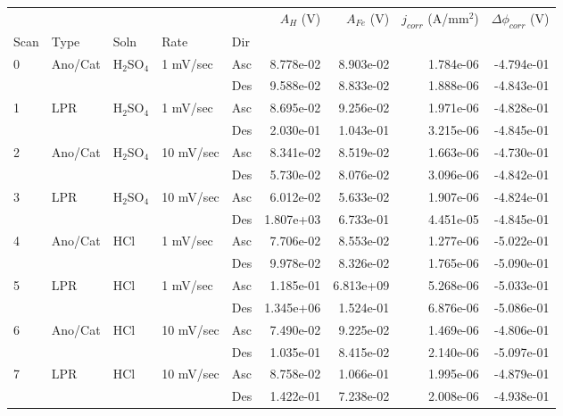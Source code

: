 \begin{tabular}{lllllrrrr}
\toprule
  &     &     &           &     &  $A_H$ (V) &  $A_{Fe}$ (V) &  $j_{corr}$ (A/mm$^2$) &  $\Delta \phi_{corr}$ (V) \\
Scan & Type & Soln & Rate & Dir &            &               &                        &                           \\
\midrule
0 & Ano/Cat & H$_2$SO$_4$ & 1 mV/sec & Asc &  8.778e-02 &     8.903e-02 &              1.784e-06 &                -4.794e-01 \\
  &     &     &           & Des &  9.588e-02 &     8.833e-02 &              1.888e-06 &                -4.843e-01 \\
1 & LPR & H$_2$SO$_4$ & 1 mV/sec & Asc &  8.695e-02 &     9.256e-02 &              1.971e-06 &                -4.828e-01 \\
  &     &     &           & Des &  2.030e-01 &     1.043e-01 &              3.215e-06 &                -4.845e-01 \\
2 & Ano/Cat & H$_2$SO$_4$ & 10 mV/sec & Asc &  8.341e-02 &     8.519e-02 &              1.663e-06 &                -4.730e-01 \\
  &     &     &           & Des &  5.730e-02 &     8.076e-02 &              3.096e-06 &                -4.842e-01 \\
3 & LPR & H$_2$SO$_4$ & 10 mV/sec & Asc &  6.012e-02 &     5.633e-02 &              1.907e-06 &                -4.824e-01 \\
  &     &     &           & Des &  1.807e+03 &     6.733e-01 &              4.451e-05 &                -4.845e-01 \\
4 & Ano/Cat & HCl & 1 mV/sec & Asc &  7.706e-02 &     8.553e-02 &              1.277e-06 &                -5.022e-01 \\
  &     &     &           & Des &  9.978e-02 &     8.326e-02 &              1.765e-06 &                -5.090e-01 \\
5 & LPR & HCl & 1 mV/sec & Asc &  1.185e-01 &     6.813e+09 &              5.268e-06 &                -5.033e-01 \\
  &     &     &           & Des &  1.345e+06 &     1.524e-01 &              6.876e-06 &                -5.086e-01 \\
6 & Ano/Cat & HCl & 10 mV/sec & Asc &  7.490e-02 &     9.225e-02 &              1.469e-06 &                -4.806e-01 \\
  &     &     &           & Des &  1.035e-01 &     8.415e-02 &              2.140e-06 &                -5.097e-01 \\
7 & LPR & HCl & 10 mV/sec & Asc &  8.758e-02 &     1.066e-01 &              1.995e-06 &                -4.879e-01 \\
  &     &     &           & Des &  1.422e-01 &     7.238e-02 &              2.008e-06 &                -4.938e-01 \\
\bottomrule
\end{tabular}
